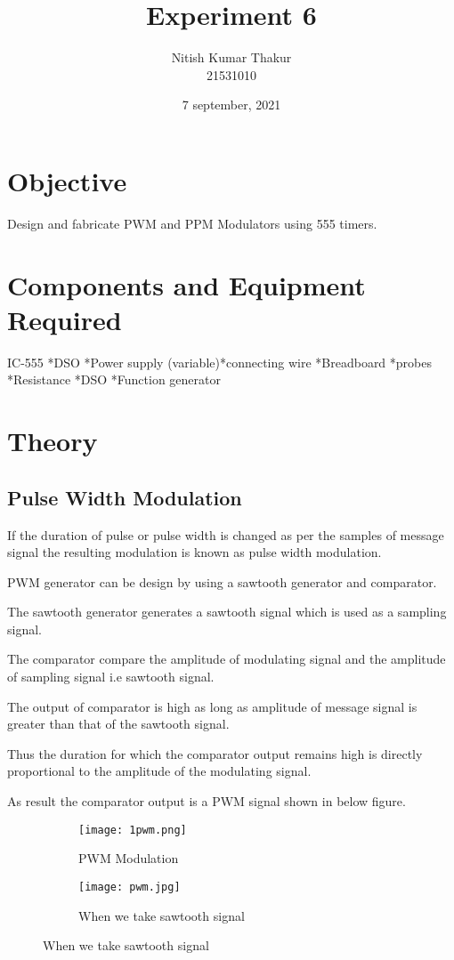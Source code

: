 \documentclass{article}
\title{Experiment 6}
\author{Nitish Kumar Thakur \\ 21531010 }
\date{7 september, 2021}
\begin{document}
\maketitle

\section{Objective}
Design and fabricate PWM and PPM Modulators using 555 timers.
 
 \section{Components and Equipment Required}                    
 IC-555 *DSO *Power supply (variable)*connecting wire *Breadboard *probes *Resistance *DSO *Function generator
 
\section{Theory}
\subsection{Pulse Width Modulation}
If the duration of pulse or pulse width is changed as per the samples of message signal the resulting modulation is known as pulse width modulation.\par
PWM generator can be design by using a sawtooth generator and comparator.\par
The sawtooth generator generates a sawtooth signal which is used as a sampling signal.\par
The comparator compare the amplitude of modulating signal and the amplitude of sampling signal i.e sawtooth signal.\par
The output of comparator is high as long as amplitude of message signal is greater than that of the sawtooth signal.\par
Thus the duration for which the comparator output remains high is directly proportional to the amplitude of the modulating signal.\par
As result the comparator output is a PWM signal shown in below figure.
\begin{figure}[h]
  \begin{subfigure}[b]{0.5\textwidth}
    \texttt{[image: 1pwm.png]}
    \caption{PWM Modulation}
    \label{fig:1}
  \end{subfigure}
  \begin{subfigure}[b]{0.4\textwidth}
    \texttt{[image: pwm.jpg]}
    \caption{When we take sawtooth signal}
    \label{fig:2}
  \end{subfigure}
\end{figure}
\end{document}
